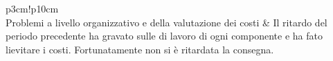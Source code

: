 \begin{longtable}{p{3cm}!{\VRule[1pt]}p{10cm}}
 \\
Problemi a livello organizzativo e della valutazione dei costi	& Il ritardo del periodo precedente ha gravato sulle di lavoro di ogni componente e ha fato lievitare i costi. Fortunatamente non si è ritardata la consegna.
\caption{Attualizzazione dei rischi}
\end{longtable}